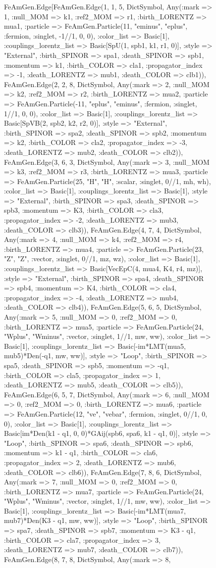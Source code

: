 \documentclass{revtex4}
\begin{document}
\begin{figure}[!htb]
\begin{center}
{FeAmGen.Edge[FeAmGen.Edge(1, 1, 5, Dict{Symbol, Any}(:mark => 1, :null_MOM => k1, :ref2_MOM => r1, :birth_LORENTZ => mua1, :particle => FeAmGen.Particle(11, "eminus", "eplus", :fermion, :singlet, -1//1, 0, 0), :color_list => Basic[1], :couplings_lorentz_list => Basic[SpU(1, spb1, k1, r1, 0)], :style => "External", :birth_SPINOR => spa1, :death_SPINOR => spb1, :momentum => k1, :birth_COLOR => cla1, :propagator_index => -1, :death_LORENTZ => mub1, :death_COLOR => clb1)), FeAmGen.Edge(2, 2, 8, Dict{Symbol, Any}(:mark => 2, :null_MOM => k2, :ref2_MOM => r2, :birth_LORENTZ => mua2, :particle => FeAmGen.Particle(-11, "eplus", "eminus", :fermion, :singlet, 1//1, 0, 0), :color_list => Basic[1], :couplings_lorentz_list => Basic[SpVB(2, spb2, k2, r2, 0)], :style => "External", :birth_SPINOR => spa2, :death_SPINOR => spb2, :momentum => k2, :birth_COLOR => cla2, :propagator_index => -3, :death_LORENTZ => mub2, :death_COLOR => clb2)), FeAmGen.Edge(3, 6, 3, Dict{Symbol, Any}(:mark => 3, :null_MOM => k3, :ref2_MOM => r3, :birth_LORENTZ => mua3, :particle => FeAmGen.Particle(25, "H", "H", :scalar, :singlet, 0//1, mh, wh), :color_list => Basic[1], :couplings_lorentz_list => Basic[1], :style => "External", :birth_SPINOR => spa3, :death_SPINOR => spb3, :momentum => K3, :birth_COLOR => cla3, :propagator_index => -2, :death_LORENTZ => mub3, :death_COLOR => clb3)), FeAmGen.Edge(4, 7, 4, Dict{Symbol, Any}(:mark => 4, :null_MOM => k4, :ref2_MOM => r4, :birth_LORENTZ => mua4, :particle => FeAmGen.Particle(23, "Z", "Z", :vector, :singlet, 0//1, mz, wz), :color_list => Basic[1], :couplings_lorentz_list => Basic[VecEpC(4, mua4, K4, r4, mz)], :style => "External", :birth_SPINOR => spa4, :death_SPINOR => spb4, :momentum => K4, :birth_COLOR => cla4, :propagator_index => -4, :death_LORENTZ => mub4, :death_COLOR => clb4)), FeAmGen.Edge(5, 6, 5, Dict{Symbol, Any}(:mark => 5, :null_MOM => 0, :ref2_MOM => 0, :birth_LORENTZ => mua5, :particle => FeAmGen.Particle(24, "Wplus", "Wminus", :vector, :singlet, 1//1, mw, ww), :color_list => Basic[1], :couplings_lorentz_list => Basic[-im*LMT(mua5, mub5)*Den(-q1, mw, ww)], :style => "Loop", :birth_SPINOR => spa5, :death_SPINOR => spb5, :momentum => -q1, :birth_COLOR => cla5, :propagator_index => 1, :death_LORENTZ => mub5, :death_COLOR => clb5)), FeAmGen.Edge(6, 5, 7, Dict{Symbol, Any}(:mark => 6, :null_MOM => 0, :ref2_MOM => 0, :birth_LORENTZ => mua6, :particle => FeAmGen.Particle(12, "ve", "vebar", :fermion, :singlet, 0//1, 0, 0), :color_list => Basic[1], :couplings_lorentz_list => Basic[im*Den(k1 - q1, 0, 0)*GAij(spb6, spa6, k1 - q1, 0)], :style => "Loop", :birth_SPINOR => spa6, :death_SPINOR => spb6, :momentum => k1 - q1, :birth_COLOR => cla6, :propagator_index => 2, :death_LORENTZ => mub6, :death_COLOR => clb6)), FeAmGen.Edge(7, 8, 6, Dict{Symbol, Any}(:mark => 7, :null_MOM => 0, :ref2_MOM => 0, :birth_LORENTZ => mua7, :particle => FeAmGen.Particle(24, "Wplus", "Wminus", :vector, :singlet, 1//1, mw, ww), :color_list => Basic[1], :couplings_lorentz_list => Basic[-im*LMT(mua7, mub7)*Den(K3 - q1, mw, ww)], :style => "Loop", :birth_SPINOR => spa7, :death_SPINOR => spb7, :momentum => K3 - q1, :birth_COLOR => cla7, :propagator_index => 3, :death_LORENTZ => mub7, :death_COLOR => clb7)), FeAmGen.Edge(8, 7, 8, Dict{Symbol, Any}(:mark => 8, }
\end{center}
\end{figure}
\end{document}
